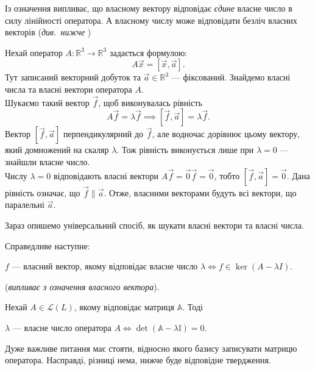 \documentclass{math_library}
\begin{document}
\begin{remark}
Із означення випливає, що власному вектору відповідає \emph{єдине} власне число в силу лінійності оператора. А власному числу може відповідати безліч власних векторів (\textit{див.\ нижче })
\end{remark}

\begin{example}
Нехай оператор $A \colon \mathbb{R}^3 \to \mathbb{R}^3$ задається формулою:
\[
A \vec{x} = [\vec{x},\vec{a}].
\]
Тут записаний векторний добуток та $\vec{a} \in \mathbb{R}^3$ --- фіксований. Знайдемо власні числа та власні вектори оператора $A$.
\bigskip \\
Шукаємо такий вектор $\vec{f}$, щоб виконувалась рівність
\[
A \vec{f} = \lambda \vec{f} \implies [\vec{f},\vec{a}] = \lambda \vec{f}.
\]
Вектор $[\vec{f},\vec{a}]$ перпендикулярний до $\vec{f}$, але водночас дорівнює цьому вектору, який домножений на скаляр $\lambda$. Тож рівність виконується лише при $\lambda = 0$ --- знайшли власне число.\\
Числу $\lambda = 0$  відповідають власні вектори $A\vec{f} = \vec{0} \vec{f} = \vec{0}$, тобто $[\vec{f},\vec{a}] = \vec{0}$. Дана рівність означає, що $\vec{f} \parallel \vec{a}$. Отже, власними векторами будуть всі вектори, що паралельні $\vec{a}$.
\end{example}
\noindent
Зараз опишемо універсальний спосіб, як шукати власні вектори та власні числа.

\begin{corollary}
Справедливе наступне:
\begin{center}
$f$ --- власний вектор, якому відповідає власне число $\lambda \iff f \in \ker (A-\lambda I)$.
\end{center}
(\textit{випливає з означення власного вектора}).
\end{corollary}

\begin{proposition}
Нехай $A \in \mathcal{L}(L)$, якому відповідає матриця $\mathbb{A}$. Тоді
\begin{center}
$\lambda$ --- власне число оператора $A \iff \det(\mathbb{A} - \lambda \mathbb{I}) = 0$.
\end{center}
\end{proposition}

\begin{remark}
Дуже важливе питання має стояти, відносно якого базису записувати матрицю оператора. Насправді, різниці нема, нижче буде відповідне твердження.
\end{remark}
\end{document}
